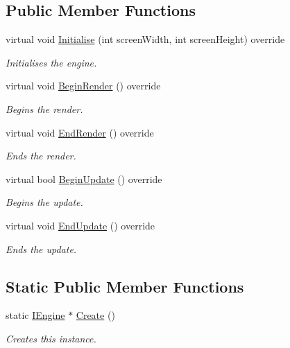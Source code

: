 \subsection*{Public Member Functions}
\begin{DoxyCompactItemize}
\item 
virtual void \hyperlink{class_g_l_engine_a8e0944601bd7a7f367ede6b37e9cf9a3}{Initialise} (int screen\+Width, int screen\+Height) override
\begin{DoxyCompactList}\small\item\em Initialises the engine. \end{DoxyCompactList}\item 
virtual void \hyperlink{class_g_l_engine_ae3be9150d8a2cd7a25738bf1a45464f1}{Begin\+Render} () override
\begin{DoxyCompactList}\small\item\em Begins the render. \end{DoxyCompactList}\item 
virtual void \hyperlink{class_g_l_engine_a1c3c54d15ba06b57408f0eff8669033d}{End\+Render} () override
\begin{DoxyCompactList}\small\item\em Ends the render. \end{DoxyCompactList}\item 
virtual bool \hyperlink{class_g_l_engine_a64b45d1833aee7a2fae1f1a1bfad0853}{Begin\+Update} () override
\begin{DoxyCompactList}\small\item\em Begins the update. \end{DoxyCompactList}\item 
virtual void \hyperlink{class_g_l_engine_a78172cec86783625c2d05802f4e8c666}{End\+Update} () override
\begin{DoxyCompactList}\small\item\em Ends the update. \end{DoxyCompactList}\end{DoxyCompactItemize}
\subsection*{Static Public Member Functions}
\begin{DoxyCompactItemize}
\item 
static \hyperlink{class_i_engine}{I\+Engine} $\ast$ \hyperlink{class_g_l_engine_a98bc2ed4554ebc8aac0e119158952d5c}{Create} ()
\begin{DoxyCompactList}\small\item\em Creates this instance. \end{DoxyCompactList}\end{DoxyCompactItemize}
